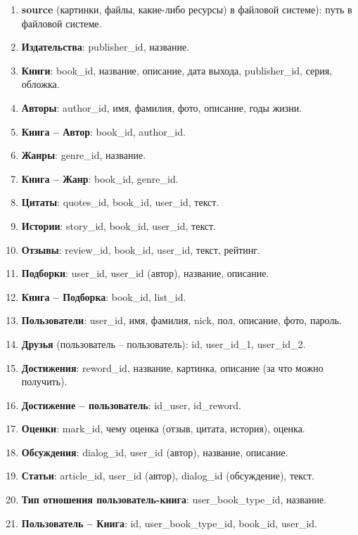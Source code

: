 \documentclass[a4paper,12pt]{article}
\begin{document}
\begin{enumerate}
    \item \textbf{source} (картинки, файлы, какие-либо ресурсы) в файловой системе): путь в файловой системе.
    \item \textbf{Издательства}: publisher\_id, название.
    \item \textbf{Книги}: book\_id, название, описание, дата выхода, publisher\_id, серия, обложка.
    \item \textbf{Авторы}: author\_id, имя, фамилия, фото, описание, годы жизни.
    \item \textbf{Книга – Автор}: book\_id, author\_id.
    \item \textbf{Жанры}: genre\_id, название.
    \item \textbf{Книга – Жанр}: book\_id, genre\_id.
    \item \textbf{Цитаты}: quotes\_id, book\_id, user\_id, текст.
    \item \textbf{Истории}: story\_id, book\_id, user\_id, текст.
    \item \textbf{Отзывы}: review\_id, book\_id, user\_id, текст, рейтинг.
    \item \textbf{Подборки}: user\_id, user\_id (автор), название, описание.
    \item \textbf{Книга – Подборка}: book\_id, list\_id.
    \item \textbf{Пользователи}: user\_id, имя, фамилия, nick, пол, описание, фото, пароль.
    \item \textbf{Друзья} (пользователь – пользователь): id, user\_id\_1, user\_id\_2.
    \item \textbf{Достижения}: reword\_id, название, картинка, описание (за что можно получить).
    \item \textbf{Достижение – пользователь}: id\_user, id\_reword.
    \item \textbf{Оценки}: mark\_id, чему оценка (отзыв, цитата, история), оценка.
    \item \textbf{Обсуждения}: dialog\_id, user\_id (автор), название, описание.
    \item \textbf{Статьи}: article\_id, user\_id (автор), dialog\_id (обсуждение), текст.
    \item \textbf{Тип отношения пользователь-книга}: user\_book\_type\_id, название.
    \item \textbf{Пользователь – Книга}: id, user\_book\_type\_id, book\_id, user\_id.
\end{enumerate}
\end{document}

